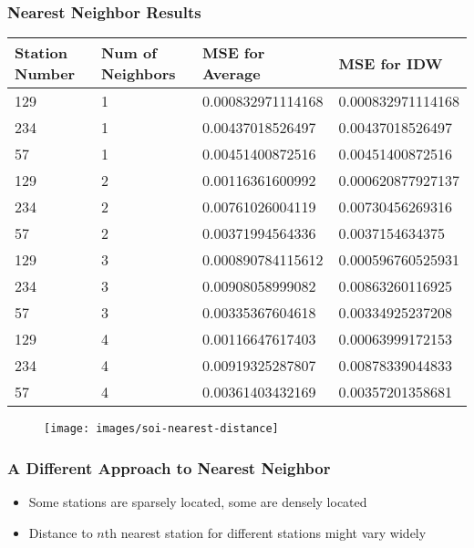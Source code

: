 \begin{frame}
\frametitle{Nearest Neighbor Results}
\centering
\footnotesize
\begin{tabular}{|l|l|l|l|}
\hline
\textbf{Station Number} & \textbf{Num of Neighbors} & \textbf{MSE for Average} &\textbf{MSE for IDW}\\
\hline
129 & 1 & 0.000832971114168 & 0.000832971114168\\
\hline
234 & 1 & 0.00437018526497 & 0.00437018526497\\
\hline
57 & 1 & 0.00451400872516 & 0.00451400872516\\
\hline
129 & 2 & 0.00116361600992 & 0.000620877927137\\
\hline
234 & 2 & 0.00761026004119 & 0.00730456269316\\
\hline
57 & 2 & 0.00371994564336 & 0.0037154634375\\
\hline
129 & 3 & 0.000890784115612 & 0.000596760525931\\
\hline
234 & 3 & 0.00908058999082 & 0.00863260116925\\
\hline
57 & 3 & 0.00335367604618 & 0.00334925237208\\
\hline
129 & 4 & 0.00116647617403 & 0.00063999172153\\
\hline
234 & 4 & 0.00919325287807 & 0.00878339044833\\
\hline
57 & 4 & 0.00361403432169 & 0.00357201358681\\
\hline
\end{tabular}
\end{frame}

\begin{frame}
\begin{figure}
\texttt{[image: images/soi-nearest-distance]}
\end{figure}
\end{frame}

\begin{frame}
\frametitle{A Different Approach to Nearest Neighbor}
\begin{itemize}
\setlength\itemsep{1em}
\item Some stations are sparsely located, some are densely located
\item Distance to $n$th nearest station for different stations might vary widely
\end{itemize}
\end{frame}
